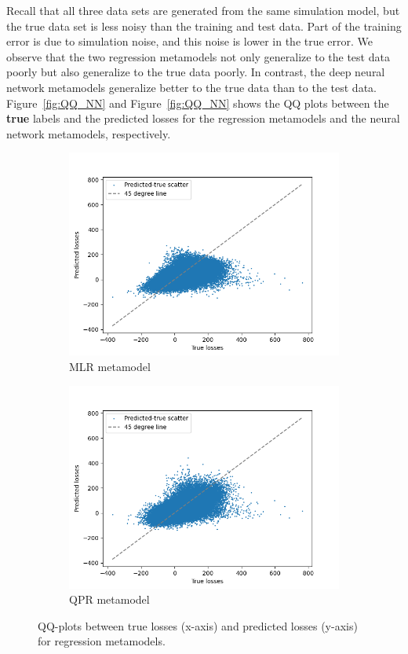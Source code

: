 \documentclass{article}
\begin{document}
Recall that all three data sets are generated from the same simulation model, but the true data set is less noisy than the training and test data.
Part of the training error is due to simulation noise, and this noise is lower in the true error.
We observe that the two regression metamodels not only generalize to the test data poorly but also generalize to the true data poorly.
In contrast, the deep neural network metamodels generalize better to the true data than to the test data.
Figure~\ref{fig:QQ_NN} and Figure~\ref{fig:QQ_NN} shows the QQ plots between the \textbf{true} labels and the predicted losses for the regression metamodels and the neural network metamodels, respectively.

\begin{figure}[ht!]
    \centering
    \begin{subfigure}{0.48\textwidth}
        \includegraphics[width=\textwidth]{./figures/qqPlots/mlrLN.png}
        \caption{MLR metamodel}
    \end{subfigure}\hfill
    \begin{subfigure}{0.48\textwidth}
        \includegraphics[width=\textwidth]{./figures/qqPlots/qprLN.png}
        \caption{QPR metamodel}
    \end{subfigure}
    \caption{QQ-plots between true losses (x-axis) and predicted losses (y-axis) for regression metamodels.} 
    \label{fig:QQ_REG}
\end{figure}
\end{document}
